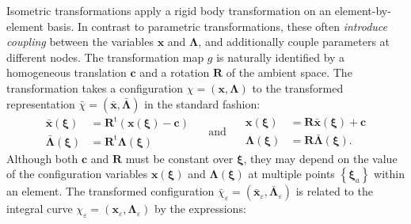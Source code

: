 Isometric transformations apply a rigid body transformation on an
element-by-element basis. In contrast to parametric transformations,
these often \emph{introduce coupling} between the variables
\(\bm{x}\) and \(\bm{\Lambda}\), and additionally couple parameters at
different nodes. The transformation map \(g\) is naturally identified by
a homogeneous translation \(\bm{c}\) and a rotation \(\bm{R}\) of the
ambient space. The transformation takes a configuration
\(\chi = (\bm{x},\bm{\Lambda})\) to the transformed representation
\(\bar{\chi} = (\bar{\bm{x}},\bar{\bm{\Lambda}})\) in the standard
fashion:
\begin{equation}
  \begin{aligned}
  \bar{\bm{x}}(\bm{\xi}) &= \bm{R}^{\mathrm{t}}\left(\bm{x}(\bm{\xi}) - \bm{c} \right) \\
  \bar{\bm{\Lambda}}(\bm{\xi})&= \bm{R}^{\mathrm{t}}\bm{\Lambda}(\bm{\xi})
  \end{aligned}
  \quad\text{ and }\quad
  \begin{aligned}
  \bm{x}(\bm{\xi}) &= \bm{R}\bar{\bm{x}}(\bm{\xi}) + \bm{c}  \\
  \bm{\Lambda}(\bm{\xi})&= \bm{R}\bar{\bm{\Lambda}}(\bm{\xi}).
  \end{aligned}
  \label{eq:tether}
\end{equation}
{
Although both \(\bm{c}\) and \(\bm{R}\)
must be constant over \(\bm{\xi}\), they may depend on the value of the
configuration variables \(\bm{x}(\bm{\xi})\) and
\(\bm{\Lambda}(\bm{\xi})\) at multiple points
\(\left\{\bm{\xi}_a\right\}\) within an element. 
%
The
transformed configuration
\(\bar{\chi}_\varepsilon = (\bar{\bm{x}}_\varepsilon, \bar{\bm{\Lambda}}_\varepsilon)\)
is related to the integral curve
\(\chi_\varepsilon = (\bm{x}_\varepsilon, \bm{\Lambda}_\varepsilon)\) by
the expressions:}

